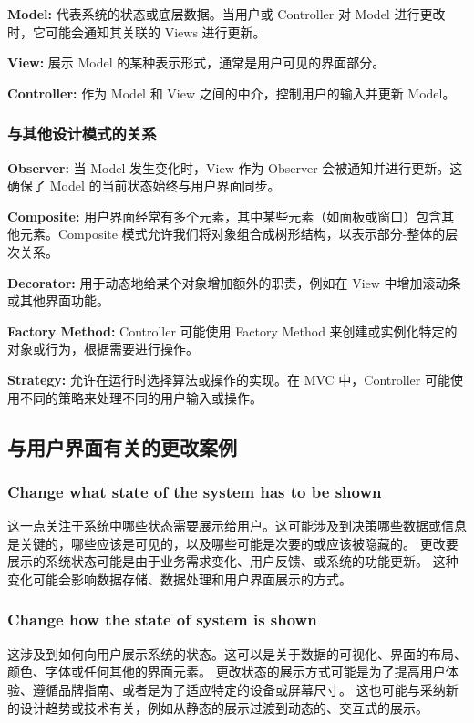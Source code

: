 \textbf{Model: }代表系统的状态或底层数据。当用户或 Controller 对 Model 进行更改时，它可能会通知其关联的 Views 进行更新。

\textbf{View: }展示 Model 的某种表示形式，通常是用户可见的界面部分。

\textbf{Controller: }作为 Model 和 View 之间的中介，控制用户的输入并更新 Model。

\subsubsection{与其他设计模式的关系}

\textbf{Observer: }当 Model 发生变化时，View 作为 Observer 会被通知并进行更新。这确保了 Model 的当前状态始终与用户界面同步。

\textbf{Composite: }用户界面经常有多个元素，其中某些元素（如面板或窗口）包含其他元素。Composite 模式允许我们将对象组合成树形结构，以表示部分-整体的层次关系。

\textbf{Decorator: }用于动态地给某个对象增加额外的职责，例如在 View 中增加滚动条或其他界面功能。

\textbf{Factory Method: }Controller 可能使用 Factory Method 来创建或实例化特定的对象或行为，根据需要进行操作。

\textbf{Strategy: }允许在运行时选择算法或操作的实现。在 MVC 中，Controller 可能使用不同的策略来处理不同的用户输入或操作。

\subsection{与用户界面有关的更改案例}

\subsubsection{Change what state of the system has to be shown}
这一点关注于系统中哪些状态需要展示给用户。这可能涉及到决策哪些数据或信息是关键的，哪些应该是可见的，以及哪些可能是次要的或应该被隐藏的。
更改要展示的系统状态可能是由于业务需求变化、用户反馈、或系统的功能更新。
这种变化可能会影响数据存储、数据处理和用户界面展示的方式。

\subsubsection{Change how the state of system is shown}
这涉及到如何向用户展示系统的状态。这可以是关于数据的可视化、界面的布局、颜色、字体或任何其他的界面元素。
更改状态的展示方式可能是为了提高用户体验、遵循品牌指南、或者是为了适应特定的设备或屏幕尺寸。
这也可能与采纳新的设计趋势或技术有关，例如从静态的展示过渡到动态的、交互式的展示。

